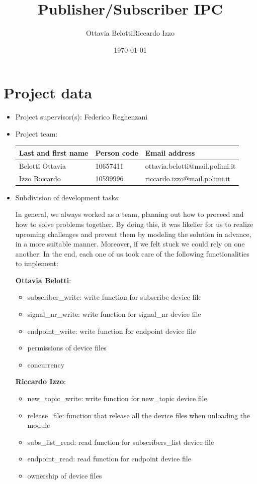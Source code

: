 \documentclass[10pt,a4]{article}
\author{Ottavia Belotti\quad Riccardo Izzo}
\date{\today}
\title{Publisher/Subscriber IPC}
\begin{document}
\maketitle
\tableofcontents

\section{Project data}

\begin{itemize}
\item 
  Project supervisor(s): Federico Reghenzani

\item 
Project team:

\begin{center}
\begin{tabular}{lll}
Last and first name & Person code & Email address\\
\hline
  Belotti Ottavia & 10657411 & ottavia.belotti@mail.polimi.it \\
  Izzo Riccardo & 10599996 & riccardo.izzo@mail.polimi.it                     
\end{tabular}
\end{center}

\item
Subdivision of development tasks:

In general, we always worked as a team, planning out how to proceed and how to solve problems together. By doing this, it was likelier for us to realize upcoming challenges and prevent them by modeling the solution in advance, in a more suitable manner. Moreover, if we felt stuck we could rely on one another. In the end, each one of us took care of the following functionalities to implement:

\textbf{Ottavia Belotti}:
\begin{itemize}
  \item subscriber\_write: write function for subscribe device file
  \item signal\_nr\_write: write function for signal\_nr device file
  \item endpoint\_write: write function for endpoint device file
  \item permissions of device files
  \item concurrency
\end{itemize}
\newpage
\textbf{Riccardo Izzo}:
\begin{itemize}
  \item new\_topic\_write: write function for new\_topic device file
  \item release\_file: function that release all the device files when unloading the module
  \item subs\_list\_read: read function for subscribers\_list device file
  \item endpoint\_read: read function for endpoint device file
  \item ownership of device files
\end{itemize}


\end{itemize}
\end{document}
